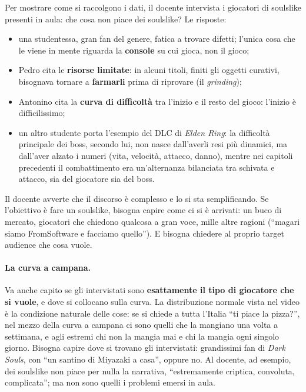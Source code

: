 Per mostrare come si raccolgono i dati, il docente intervista i giocatori di
soulslike presenti in aula: che cosa non piace dei soulslike? Le risposte:
\begin{itemize}
  \item una studentessa, gran fan del genere, fatica a trovare difetti; l'unica
        cosa che le viene in mente riguarda la \textbf{console} su cui gioca,
        non il gioco;
  \item Pedro cita le \textbf{risorse limitate}: in alcuni titoli, finiti gli
        oggetti curativi, bisognava tornare a \textbf{farmarli} prima di
        riprovare (il \emph{grinding});
  \item Antonino cita la \textbf{curva di difficoltà} tra l'inizio e il resto
        del gioco: l'inizio è difficilissimo;
  \item un altro studente porta l'esempio del DLC di \emph{Elden Ring}: la
        difficoltà principale dei boss, secondo lui, non nasce dall'averli
        resi più dinamici, ma dall'aver alzato i numeri (vita, velocità,
        attacco, danno), mentre nei capitoli precedenti il combattimento era
        un'alternanza bilanciata tra schivata e attacco, sia del giocatore sia
        del boss.
\end{itemize}

Il docente avverte che il discorso è complesso e lo si sta semplificando.
Se l'obiettivo è fare un soulslike, bisogna capire come ci si è arrivati: un
buco di mercato, giocatori che chiedono qualcosa a gran voce, mille altre
ragioni (``magari siamo FromSoftware e facciamo quello''). E bisogna chiedere
al proprio target audience che cosa vuole.

\paragraph{La curva a campana.} Va anche capito se gli intervistati sono
\textbf{esattamente il tipo di giocatore che si vuole}, e dove si collocano
sulla curva. La distribuzione normale vista nel video è la condizione
naturale delle cose: se si chiede a tutta l'Italia ``ti piace la pizza?'', nel
mezzo della curva a campana ci sono quelli che la mangiano una volta a
settimana, e agli estremi chi non la mangia mai e chi la mangia ogni singolo
giorno. Bisogna capire dove si trovano gli intervistati: grandissimi fan di
\emph{Dark Souls}, con ``un santino di Miyazaki a casa'', oppure no. Al
docente, ad esempio, dei soulslike non piace per nulla la narrativa,
``estremamente criptica, convoluta, complicata''; ma non sono quelli i
problemi emersi in aula.


